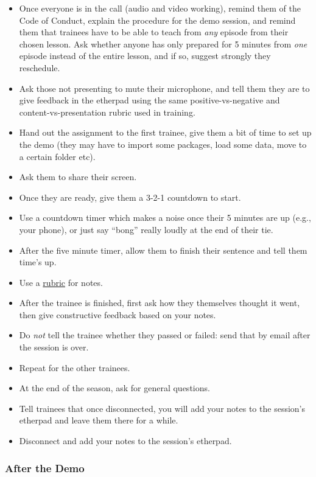 \begin{itemize}
\itemsep1pt\parskip0pt
\item
  Once everyone is in the call (audio and video working), remind them of
  the Code of Conduct, explain the procedure for the demo session, and
  remind them that trainees have to be able to teach from \emph{any}
  episode from their chosen lesson. Ask whether anyone has only prepared
  for 5 minutes from \emph{one} episode instead of the entire lesson,
  and if so, suggest strongly they reschedule.
\item
  Ask those not presenting to mute their microphone, and tell them they
  are to give feedback in the etherpad using the same
  positive-vs-negative and content-vs-presentation rubric used in
  training.
\item
  Hand out the assignment to the first trainee, give them a bit of time
  to set up the demo (they may have to import some packages, load some
  data, move to a certain folder etc).
\item
  Ask them to share their screen.
\item
  Once they are ready, give them a 3-2-1 countdown to start.
\item
  Use a countdown timer which makes a noise once their 5 minutes are up
  (e.g., your phone), or just say ``bong'' really loudly at the end of
  their tie.
\item
  After the five minute timer, allow them to finish their sentence and
  tell them time's up.
\item
  Use a
  \href{\{\{\%20page.root\%20\}\}/files/teaching-demo-rubric.md}{rubric}
  for notes.
\item
  After the trainee is finished, first ask how they themselves thought
  it went, then give constructive feedback based on your notes.
\item
  Do \emph{not} tell the trainee whether they passed or failed: send
  that by email after the session is over.
\item
  Repeat for the other trainees.
\item
  At the end of the season, ask for general questions.
\item
  Tell trainees that once disconnected, you will add your notes to the
  session's etherpad and leave them there for a while.
\item
  Disconnect and add your notes to the session's etherpad.
\end{itemize}

\subsubsection{After the Demo}\label{after-the-demo}

